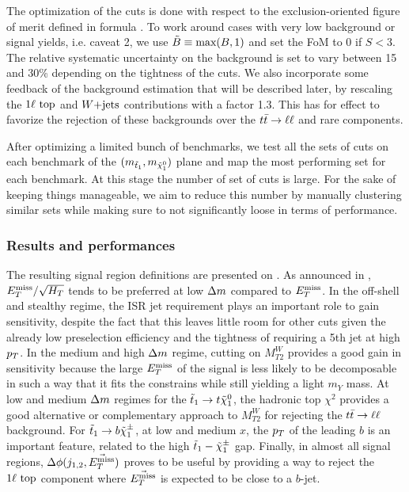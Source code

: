     The optimization of the cuts is done with respect to the exclusion-oriented figure of
    merit defined in formula . To work around cases with very low background or signal yields,
    i.e. caveat 2, we use $\tilde{B} \equiv \text{max}(B,1)$ and set the FoM to 0
    if $S < 3$. The relative systematic uncertainty on the background is set to vary between
    15 and 30\% depending on the tightness of the cuts. We also incorporate some feedback
    of the background estimation that will be described later, by rescaling the $1\ell~\text{top}$
    and $\text{$W$+jets}$ contributions with a factor 1.3. This has for effect to favorize the
    rejection of these backgrounds over the $t\bar{t} \rightarrow \ell \ell$ and rare components.

    After optimizing a limited bunch of benchmarks, we test all the sets of cuts on each
    benchmark of the $(m_{\tilde{t}_1},m_{\tilde{\chi}_1^0})$ plane and map the
    most performing set for each benchmark. At this stage the number of set of cuts is
    large. For the sake of keeping things manageable, we aim to reduce this number by
    manually clustering similar sets while making sure to not significantly loose in
    terms of performance.

        \subsubsection{Results and performances \label{sec:cutAndCountPerformances}}

    The resulting signal region definitions are presented on .
    As announced in , $E_T^\text{miss}/\sqrt{H_T}$ tends to be
    preferred at low $\Delta m$ compared to $E_T^\text{miss}$. In the off-shell and stealthy regime,
    the ISR jet requirement plays an important role to gain sensitivity, despite the
    fact that this leaves little room for other cuts given the already low preselection
    efficiency and the tightness of requiring a 5th jet at high $p_T$.
    In the medium and high $\Delta m$ regime, cutting on $M_{T2}^W$ provides a good gain
    in sensitivity because the large $E_T^\text{miss}$ of the signal is less likely to be decomposable
    in such a way that it fits the constrains while still yielding a light $m_Y$ mass.
    At low and medium $\Delta m$ regimes for the $\tilde{t}_1 \rightarrow t \tilde{\chi}_1^0$, the
    hadronic top $\chi^2$ provides a good alternative or complementary approach to $M_{T2}^{W}$
    for rejecting the $t\bar{t} \rightarrow \ell \ell$ background. For $\tilde{t}_1 \rightarrow b \tilde{\chi}_1^\pm$,
    at low and medium $x$, the $p_T$ of the leading $b$ is an important feature, related
    to the high $\tilde{t}_1-\tilde{\chi}_1^\pm$ gap. Finally, in almost all signal regions,
    $\Delta\phi(j_{1,2},\vec{E_T^\text{miss}})$ proves to be useful by providing a way to reject the
    $1\ell~\text{top}$ component where $\vec{E_T^\text{miss}}$ is expected to be close to a $b$-jet.

